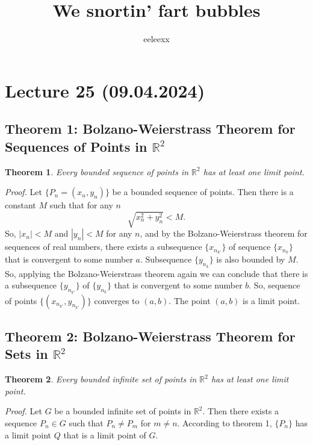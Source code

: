 \documentclass{article}
\author{eeleexx}
\title{We snortin' fart bubbles}
\newtheorem{theorem}{Theorem}
\begin{document}
\maketitle

\section*{Lecture 25 (09.04.2024)}

\subsection*{Theorem 1: Bolzano-Weierstrass Theorem for Sequences of Points in $\mathbb{R}^2$}

\begin{theorem}
Every bounded sequence of points in $\mathbb{R}^2$ has at least one limit point.
\end{theorem}

\vspace{1em}

\textit{Proof.} Let $\{P_n = (x_n, y_n)\}$ be a bounded sequence of points. Then there is a constant $M$ such that for any $n$
\[
\sqrt{x_n^2 + y_n^2} < M.
\]
So, $|x_n| < M$ and $|y_n| < M$ for any $n$, and by the Bolzano-Weierstrass theorem for sequences of real numbers, there exists a subsequence $\{x_{n_{k'}}\}$ of sequence $\{x_{n_k}\}$ that is convergent to some number $a$. Subsequence $\{y_{n_k}\}$ is also bounded by $M$. So, applying the Bolzano-Weierstrass theorem again we can conclude that there is a subsequence $\{y_{n_{k'}}\}$ of $\{y_{n_k}\}$ that is convergent to some number $b$. So, sequence of points $\{(x_{n_{k'}}, y_{n_{k'}})\}$ converges to $(a, b)$. The point $(a, b)$ is a limit point.

\subsection*{Theorem 2: Bolzano-Weierstrass Theorem for Sets in $\mathbb{R}^2$}

\begin{theorem}
Every bounded infinite set of points in $\mathbb{R}^2$ has at least one limit point.
\end{theorem}

\vspace{1em}

\textit{Proof.} Let $G$ be a bounded infinite set of points in $\mathbb{R}^2$. Then there exists a sequence $P_n \in G$ such that $P_n \neq P_m$ for $m \neq n$. According to theorem 1, $\{P_n\}$ has a limit point $Q$ that is a limit point of $G$.
\end{document}
